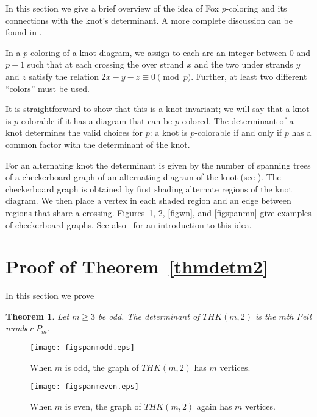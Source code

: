 \documentclass{amsart}
\newtheorem{thm}{Theorem}
\begin{document}
In this section we give a brief overview of the idea of Fox $p$-coloring and its connections with the knot's determinant. A more complete discussion can be found in \cite{L}.

In a $p$-coloring of a knot diagram, we assign  to each arc an integer 
between $0$ and $p-1$ such that at each crossing the over strand $x$ and the two under strands $y$ and $z$ satisfy the relation $2x - y - z \equiv 0 \pmod{p}$. Further, at least two different ``colors'' must be used.

It is straightforward to show that this is a knot invariant; we will say that a knot is $p$-colorable if it has a diagram that can be 
$p$-colored. The determinant of a knot determines the valid choices for
$p$:  a knot is $p$-colorable if and only if $p$ has a common factor with the determinant of the knot. 

For an alternating knot the 
determinant is given by the number of spanning
trees of a checkerboard graph of an alternating diagram of the knot (see  \cite{BZ}). The checkerboard graph is obtained by first shading alternate
regions of the knot diagram. We then place a vertex in each shaded region
and an edge between regions that share a crossing. Figures~\ref{figspanmodd}, \ref{figspanmeven}, \ref{figwn}, and \ref{figspanmn} give examples of checkerboard graphs. See also~\cite{HK} for an introduction 
to this idea.

\section{Proof of Theorem~\ref{thmdetm2}}

\setcounter{thm}{1}

In this section we prove

\begin{thm} 
Let $m \geq 3$ be odd. The determinant of $THK(m,2)$ is the $m$th Pell number $P_m$.
\end{thm}

\setcounter{thm}{6}

\begin{figure}[ht]
\begin{center}
\texttt{[image: figspanmodd.eps]}
\caption{When $m$ is odd, the graph of $THK(m,2)$ has
$m$ vertices.}\label{figspanmodd}
\end{center}
\end{figure} 

\begin{figure}[ht]
\begin{center}
\texttt{[image: figspanmeven.eps]}
\caption{When $m$ is even, the graph of $THK(m,2)$ again has
$m$ vertices.}\label{figspanmeven}
\end{center}
\end{figure} 
\end{document}
